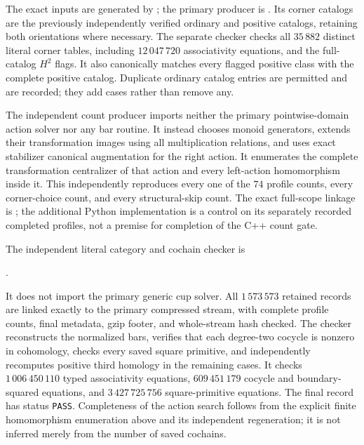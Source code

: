 \begin{remark}
\label{C:sixteen-stars-verification}
The exact inputs are generated by
; the primary producer is
.  Its corner catalogs are the
previously independently verified ordinary and positive
catalogs, retaining both orientations where necessary.
The separate checker 
checks all $35\,882$ distinct literal corner tables, including
$12\,047\,720$ associativity equations, and the full-catalog
$H^2$ flags.  It also canonically matches every flagged
positive class with the complete positive catalog.  Duplicate
ordinary catalog entries are permitted and are recorded;
they add cases rather than remove any.

The independent count producer
 imports neither the primary
pointwise-domain action solver nor any bar routine.
It instead chooses monoid generators, extends their
transformation images using all multiplication relations,
and uses exact stabilizer canonical augmentation for the
right action.  It enumerates the complete transformation
centralizer of that action and every left-action homomorphism
inside it.  This independently reproduces every one of the
$74$ profile counts, every corner-choice count, and every
structural-skip count.  The exact full-scope linkage is
; the additional
Python implementation is a control on its separately recorded
completed profiles, not a premise for completion of the C++
count gate.

The independent literal category and cochain checker is
\begin{center}.\end{center}
It does not import
the primary generic cup solver.  All $1\,573\,573$ retained
records are linked exactly to the primary compressed stream,
with complete profile counts, final metadata, gzip footer,
and whole-stream hash checked.  The checker reconstructs the
normalized bars, verifies that each degree-two cocycle is
nonzero in cohomology, checks every saved square primitive,
and independently recomputes positive third homology in the
remaining cases.  It checks $1\,006\,450\,110$ typed
associativity equations, $609\,451\,179$ cocycle and
boundary-squared equations, and $3\,427\,725\,756$
square-primitive equations.  The final record
 has status
\texttt{PASS}.
Completeness of the action search follows from the explicit
finite homomorphism enumeration above and its independent
regeneration; it is not inferred merely from the number of
saved cochains.
\end{remark}
